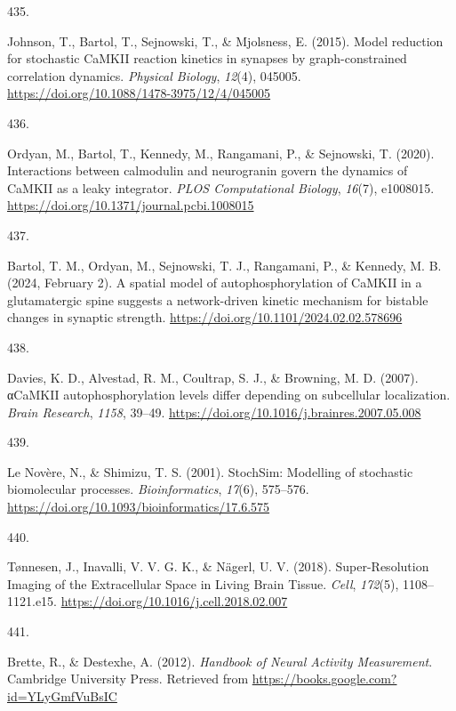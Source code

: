 \documentclass[
  11pt,
  letterpaper,
]{scrreprt}
\newlength{\cslhangindent}
\newlength{\csllabelwidth}
\newenvironment{CSLReferences}[2] %
 {\begin{list}{}{%
  \setlength{\itemindent}{0pt}
  \setlength{\leftmargin}{0pt}
  \setlength{\parsep}{0pt}
  \ifodd #1
   \setlength{\leftmargin}{\cslhangindent}
   \setlength{\itemindent}{-1\cslhangindent}
  \fi
  \setlength{\itemsep}{#2\baselineskip}}}
 {\end{list}}
\newcommand{\CSLLeftMargin}[1]{\parbox[t]{\csllabelwidth}{\strut#1\strut}}
\newcommand{\CSLRightInline}[1]{\parbox[t]{\linewidth - \csllabelwidth}{\strut#1\strut}}
\begin{document}
\begin{CSLReferences}{0}{0}
\CSLLeftMargin{435. }%
\CSLRightInline{Johnson, T., Bartol, T., Sejnowski, T., \& Mjolsness, E.
(2015). Model reduction for stochastic {CaMKII} reaction kinetics in
synapses by graph-constrained correlation dynamics. \emph{Physical
Biology}, \emph{12}(4), 045005.
\url{https://doi.org/10.1088/1478-3975/12/4/045005}}

\CSLLeftMargin{436. }%
\CSLRightInline{Ordyan, M., Bartol, T., Kennedy, M., Rangamani, P., \&
Sejnowski, T. (2020). Interactions between calmodulin and neurogranin
govern the dynamics of {CaMKII} as a leaky integrator. \emph{PLOS
Computational Biology}, \emph{16}(7), e1008015.
\url{https://doi.org/10.1371/journal.pcbi.1008015}}

\CSLLeftMargin{437. }%
\CSLRightInline{Bartol, T. M., Ordyan, M., Sejnowski, T. J., Rangamani,
P., \& Kennedy, M. B. (2024, February 2). A spatial model of
autophosphorylation of {CaMKII} in a glutamatergic spine suggests a
network-driven kinetic mechanism for bistable changes in synaptic
strength. \url{https://doi.org/10.1101/2024.02.02.578696}}

\CSLLeftMargin{438. }%
\CSLRightInline{Davies, K. D., Alvestad, R. M., Coultrap, S. J., \&
Browning, M. D. (2007). {αCaMKII} autophosphorylation levels differ
depending on subcellular localization. \emph{Brain Research},
\emph{1158}, 39--49.
\url{https://doi.org/10.1016/j.brainres.2007.05.008}}

\CSLLeftMargin{439. }%
\CSLRightInline{Le Novère, N., \& Shimizu, T. S. (2001). {StochSim}:
Modelling of stochastic biomolecular processes. \emph{Bioinformatics},
\emph{17}(6), 575--576.
\url{https://doi.org/10.1093/bioinformatics/17.6.575}}

\CSLLeftMargin{440. }%
\CSLRightInline{Tønnesen, J., Inavalli, V. V. G. K., \& Nägerl, U. V.
(2018). Super-{Resolution Imaging} of the {Extracellular Space} in
{Living Brain Tissue}. \emph{Cell}, \emph{172}(5), 1108--1121.e15.
\url{https://doi.org/10.1016/j.cell.2018.02.007}}

\CSLLeftMargin{441. }%
\CSLRightInline{Brette, R., \& Destexhe, A. (2012). \emph{Handbook of
{Neural Activity Measurement}}. Cambridge University Press. Retrieved
from \url{https://books.google.com?id=YLyGmfVuBsIC}}


\end{CSLReferences}
\end{document}
